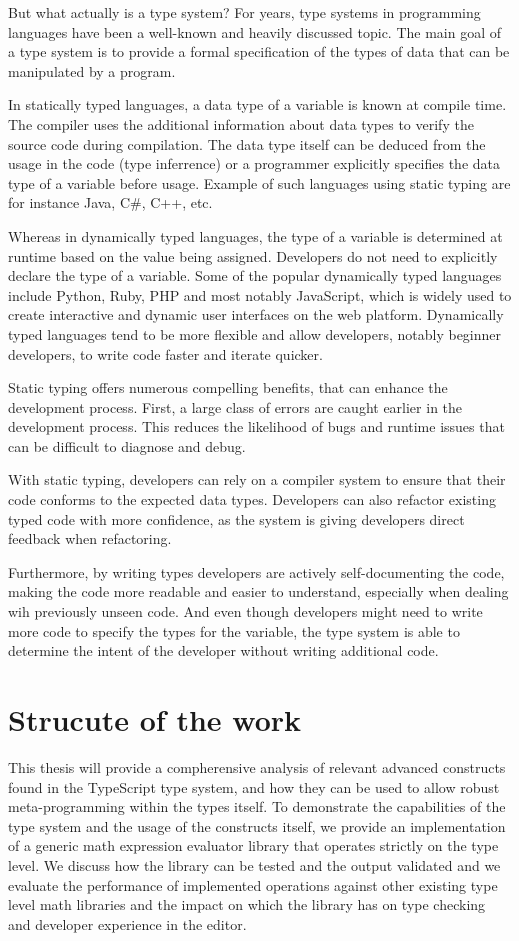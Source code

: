 But what actually is a type system? For years, type systems in programming languages have been a well-known and heavily discussed topic. The main goal of a type system is to provide a formal specification of the types of data that can be manipulated by a program.

In statically typed languages, a data type of a variable is known at compile time. The compiler uses the additional information about data types to verify the source code during compilation. The data type itself can be deduced from the usage in the code (type inferrence) or a programmer explicitly specifies the data type of a variable before usage. Example of such languages using static typing are for instance Java, C\#, C++, etc.

Whereas in dynamically typed languages, the type of a variable is determined at runtime based on the value being assigned. Developers do not need to explicitly declare the type of a variable. Some of the popular dynamically typed languages include Python, Ruby, PHP and most notably JavaScript, which is widely used to create interactive and dynamic user interfaces on the web platform. Dynamically typed languages tend to be more flexible and allow developers, notably beginner developers, to write code faster and iterate quicker.

Static typing offers numerous compelling benefits, that can enhance the development process. First, a large class of errors are caught earlier in the development process. This reduces the likelihood of bugs and runtime issues that can be difficult to diagnose and debug. 

With static typing, developers can rely on a compiler system to ensure that their code conforms to the expected data types. Developers can also refactor existing typed code with more confidence, as the system is giving developers direct feedback when refactoring. 

Furthermore, by writing types developers are actively self-documenting the code, making the code more readable and easier to understand, especially when dealing wih previously unseen code. And even though developers might need to write more code to specify the types for the variable, the type system is able to determine the intent of the developer without writing additional code. 

\section{Strucute of the work}

This thesis will provide a compherensive analysis of relevant advanced constructs found in the TypeScript type system, and how they can be used to allow robust meta-programming within the types itself. To demonstrate the capabilities of the type system and the usage of the constructs itself, we provide an implementation of a generic math expression evaluator library that operates strictly on the type level. We discuss how the library can be tested and the output validated and we evaluate the performance of implemented operations against other existing type level math libraries and the impact on which the library has on type checking and developer experience in the editor.